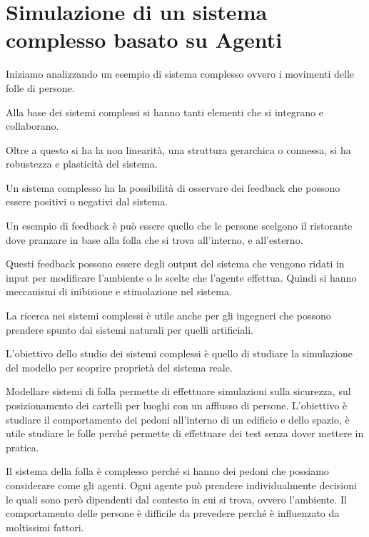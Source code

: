 \chapter{Simulazione di un sistema complesso basato su Agenti}
Iniziamo analizzando un esempio di sistema complesso ovvero i movimenti delle
folle di persone.

Alla base dei sistemi complessi si hanno tanti elementi che si integrano e
collaborano.

Oltre a questo si ha la non linearità, una struttura gerarchica o connessa, si
ha robustezza e plasticità del sistema.

Un sistema complesso ha la possibilità di osservare dei feedback che possono
essere positivi o negativi dal sistema.
\begin{esempio}
    Un esempio di feedback è può essere quello che le persone scelgono il
    ristorante dove pranzare in base alla folla che si trova all'interno, e
    all'esterno.
\end{esempio}
Questi feedback possono essere degli output del sistema che vengono ridati in
input per modificare l'ambiente o le scelte che l'agente effettua. Quindi si
hanno meccanismi di inibizione e stimolazione nel sistema.

La ricerca nei sistemi complessi è utile anche per gli ingegneri che possono prendere
spunto dai sistemi naturali per quelli artificiali.

L'obiettivo dello studio dei sistemi complessi è quello di studiare la simulazione
del modello per scoprire proprietà del sistema reale.

Modellare sistemi di folla permette di effettuare simulazioni sulla sicurezza,
sul posizionamento dei cartelli per luoghi con un afflusso di persone.
L'obiettivo è studiare il comportamento dei pedoni all'interno di un edificio e
dello spazio, è utile studiare le folle perché permette di effettuare dei test
senza dover mettere in pratica.

Il sistema della folla è complesso perché si hanno dei pedoni che possiamo
considerare come gli agenti. Ogni agente può prendere individualmente decisioni
le quali sono però dipendenti dal contesto in cui si trova, ovvero l'ambiente.
Il comportamento delle persone è difficile da prevedere perché è influenzato da
moltissimi fattori.

